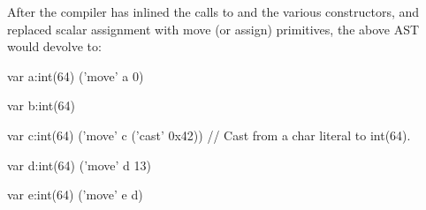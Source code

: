 After the compiler has inlined the calls to  and the various
constructors, and replaced scalar assignment with move (or assign) primitives, the above
AST would devolve to:
\begin{numberedchapel}
    var a:int(64)
    ('move' a 0)

    var b:int(64)

    var c:int(64)
    ('move' c ('cast' 0x42)) // Cast from a char literal to int(64).

    var d:int(64)
    ('move' d 13)

    var e:int(64)
    ('move' e d)
\end{numberedchapel}


